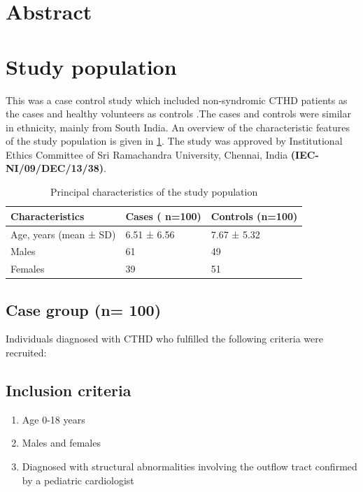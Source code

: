 \section*{Abstract}


\clearpage


\section{Study population}
This was a case control study which included non-syndromic CTHD patients as the cases and healthy volunteers as controls .The cases and controls were similar in ethnicity, mainly from South India. An overview of the characteristic features of the study population is given in \cref{tab:2.1studypopulation}. The study was approved by Institutional Ethics Committee of Sri Ramachandra University, Chennai, India \textbf{(IEC- NI/09/DEC/13/38)}. 

\begin{table}[!h]
\centering
\caption{Principal characteristics of the study population}
\label{tab:2.1studypopulation}
\begin{tabular}{ | l | l | l | }
\hline
	Characteristics & Cases ( n=100) & Controls (n=100) \\ \hline
	Age, years (mean ± SD) & 6.51 ± 6.56 & 7.67 ± 5.32 \\ \hline
	Males & 61 & 49 \\ \hline
	Females & 39 & 51 \\ \hline
\end{tabular}
\end{table}

\subsection{Case group (n= 100)}
Individuals diagnosed with CTHD who fulfilled the following criteria were recruited:

\subsection{Inclusion criteria}
\begin{enumerate}
\item Age 0-18 years 
\item Males and females 
\item Diagnosed with structural abnormalities involving the outflow tract confirmed by a
pediatric cardiologist
\end{enumerate}
	
